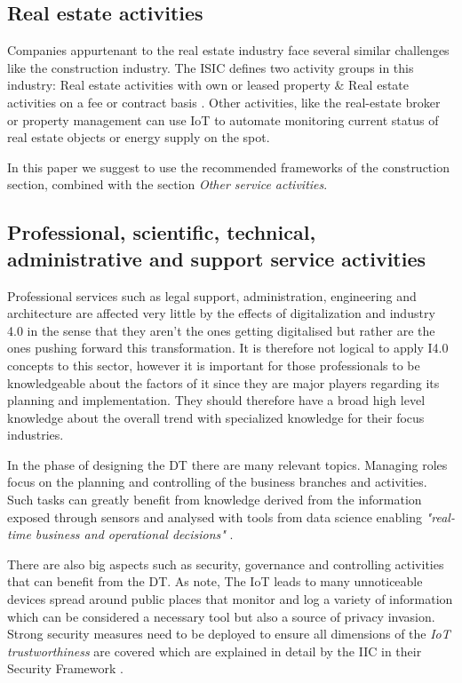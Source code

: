 \subsection{Real estate activities}

Companies appurtenant to the real estate industry face several similar challenges like the construction industry.
The \ac{ISIC} defines two activity groups in this industry: Real estate activities with own or leased property \& Real estate activities on a fee or contract basis \cite{ISIC:2008}. Other activities, like the real-estate broker or property management can use \ac{IoT} to automate monitoring current status of real estate objects or energy supply on the spot. 

In this paper we suggest to use the recommended frameworks of the construction section, combined with the section \emph{Other service activities}. 

\subsection{Professional, scientific, technical, administrative and support service activities}
\label{subsec:profscience}


Professional services such as legal support, administration, engineering and architecture are affected very little by the effects of digitalization and industry 4.0 in the sense that they aren't the ones getting digitalised but rather are the ones pushing forward this transformation. It is therefore not logical to apply \ac{I4.0} concepts to this sector, however it is important for those professionals to be knowledgeable about the factors of it since they are major players regarding its planning and implementation. They should therefore have a broad high level knowledge about the overall trend with specialized knowledge for their focus industries.

In the phase of designing the \ac{DT} there are many relevant topics. Managing roles focus on the planning and controlling of the business branches and activities. Such tasks can greatly benefit from knowledge derived from the information exposed through sensors and analysed with tools from data science enabling \emph{"real-time business and operational decisions"} \cite[p.84]{iicarchitecture:2016}.

There are also big aspects such as security, governance and controlling activities that can benefit from the \ac{DT}. As \citeauthor{Tragos2016trusted} note, The \ac{IoT} leads to many unnoticeable devices spread around public places that monitor and log a variety of information which can be considered a necessary tool but also a source of privacy invasion. Strong security measures need to be deployed to ensure all dimensions of the \emph{\ac{IoT} trustworthiness} are covered which are explained in detail by the \ac{IIC} in their Security Framework \cite{iicsecurity:2016}.

